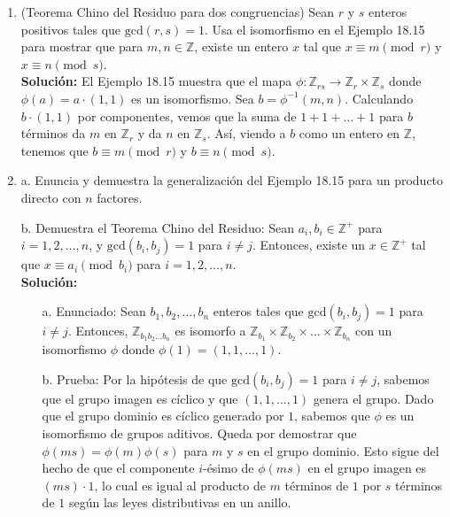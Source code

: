 \begin{enumerate}
	
	\item
	
	(Teorema Chino del Residuo para dos congruencias) Sean $r$ y $s$ enteros positivos tales que $\text{gcd}(r, s) = 1$. Usa el isomorfismo en el Ejemplo 18.15 para mostrar que para $m, n \in \mathbb{Z}$, existe un entero $x$ tal que $x \equiv m \pmod{r}$ y $x \equiv n \pmod{s}$.
	\\ \textbf{Solución:}
		El Ejemplo 18.15 muestra que el mapa $\phi : \mathbb{Z}_{rs} \rightarrow \mathbb{Z}_r \times \mathbb{Z}_s$ donde $\phi(a) = a \cdot (1, 1)$ es un isomorfismo. Sea $b = \phi^{-1}(m, n)$. Calculando $b \cdot (1, 1)$ por componentes, vemos que la suma de $1 + 1 + \ldots + 1$ para $b$ términos da $m$ en $\mathbb{Z}_r$ y da $n$ en $\mathbb{Z}_s$. Así, viendo a $b$ como un entero en $\mathbb{Z}$, tenemos que $b \equiv m \pmod{r}$ y $b \equiv n \pmod{s}$.
		
	\item
	
	a. Enuncia y demuestra la generalización del Ejemplo 18.15 para un producto directo con $n$ factores.
	
	b. Demuestra el Teorema Chino del Residuo: Sean $a_i, b_i \in \mathbb{Z}^+$ para $i = 1, 2, \ldots, n$, y $\text{gcd}(b_i, b_j) = 1$ para $i \neq j$. Entonces, existe un $x \in \mathbb{Z}^+$ tal que $x \equiv a_i \pmod{b_i}$ para $i = 1, 2, \ldots, n$.
	\\ \textbf{Solución:}
	\begin{enumerate}
		\item[a.] Enunciado: Sean $b_1, b_2, \ldots, b_n$ enteros tales que $\text{gcd}(b_i, b_j) = 1$ para $i \neq j$. Entonces, $\mathbb{Z}_{b_1 b_2 \ldots b_n}$ es isomorfo a $\mathbb{Z}_{b_1} \times \mathbb{Z}_{b_2} \times \ldots \times \mathbb{Z}_{b_n}$ con un isomorfismo $\phi$ donde $\phi(1) = (1, 1, \ldots, 1)$.
		\item[b.] Prueba: Por la hipótesis de que $\text{gcd}(b_i, b_j) = 1$ para $i \neq j$, sabemos que el grupo imagen es cíclico y que $(1, 1, \ldots, 1)$ genera el grupo. Dado que el grupo dominio es cíclico generado por $1$, sabemos que $\phi$ es un isomorfismo de grupos aditivos. Queda por demostrar que $\phi(ms) = \phi(m)\phi(s)$ para $m$ y $s$ en el grupo dominio. Esto sigue del hecho de que el componente $i$-ésimo de $\phi(ms)$ en el grupo imagen es $(ms) \cdot 1$, lo cual es igual al producto de $m$ términos de $1$ por $s$ términos de $1$ según las leyes distributivas en un anillo.
	\end{enumerate}
	

\end{enumerate}
